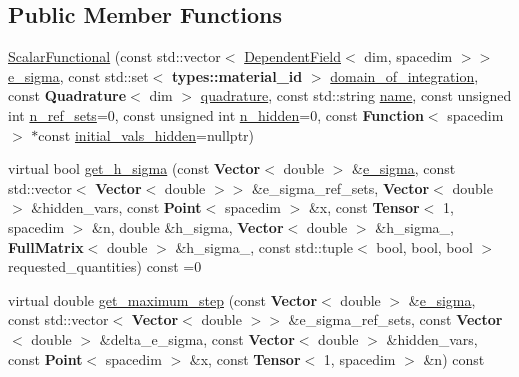 \subsection*{Public Member Functions}
\begin{DoxyCompactItemize}
\item 
\hyperlink{class_scalar_functional_ac0618ada3b80400784ee8553a66aade9}{Scalar\+Functional} (const std\+::vector$<$ \hyperlink{class_dependent_field}{Dependent\+Field}$<$ dim, spacedim $>$$>$ \hyperlink{class_scalar_functional_a86662b03a63219227993a2c6c07aefc1}{e\+\_\+sigma}, const std\+::set$<$ {\bf types\+::material\+\_\+id} $>$ \hyperlink{class_scalar_functional_ae3b6dd6934e1cd55fcc55cf344179407}{domain\+\_\+of\+\_\+integration}, const {\bf Quadrature}$<$ dim $>$ \hyperlink{class_scalar_functional_adea9ff214aeb2a1d8c3712a9d2433883}{quadrature}, const std\+::string \hyperlink{class_scalar_functional_a4d184688053b3443d10e228e4a8eba60}{name}, const unsigned int \hyperlink{class_scalar_functional_a7e12423f4b29e9e0aaa0f7f9c2d1c0eb}{n\+\_\+ref\+\_\+sets}=0, const unsigned int \hyperlink{class_scalar_functional_a8b1617930242870f22eef5e306cb717f}{n\+\_\+hidden}=0, const {\bf Function}$<$ spacedim $>$ $\ast$const \hyperlink{class_scalar_functional_a602d0bc2c945822c6b756fc63183ae2b}{initial\+\_\+vals\+\_\+hidden}=nullptr)
\item 
virtual bool \hyperlink{class_scalar_functional_a1b9874b2fd591c844ecfcd1db8212c54}{get\+\_\+h\+\_\+sigma} (const {\bf Vector}$<$ double $>$ \&\hyperlink{class_scalar_functional_a86662b03a63219227993a2c6c07aefc1}{e\+\_\+sigma}, const std\+::vector$<$ {\bf Vector}$<$ double $>$$>$ \&e\+\_\+sigma\+\_\+ref\+\_\+sets, {\bf Vector}$<$ double $>$ \&hidden\+\_\+vars, const {\bf Point}$<$ spacedim $>$ \&x, const {\bf Tensor}$<$ 1, spacedim $>$ \&n, double \&h\+\_\+sigma, {\bf Vector}$<$ double $>$ \&h\+\_\+sigma\+\_, {\bf Full\+Matrix}$<$ double $>$ \&h\+\_\+sigma\+\_, const std\+::tuple$<$ bool, bool, bool $>$ requested\+\_\+quantities) const =0
\item 
virtual double \hyperlink{class_scalar_functional_a31e4e48bb968b12fde76530c343b433d}{get\+\_\+maximum\+\_\+step} (const {\bf Vector}$<$ double $>$ \&\hyperlink{class_scalar_functional_a86662b03a63219227993a2c6c07aefc1}{e\+\_\+sigma}, const std\+::vector$<$ {\bf Vector}$<$ double $>$$>$ \&e\+\_\+sigma\+\_\+ref\+\_\+sets, const {\bf Vector}$<$ double $>$ \&delta\+\_\+e\+\_\+sigma, const {\bf Vector}$<$ double $>$ \&hidden\+\_\+vars, const {\bf Point}$<$ spacedim $>$ \&x, const {\bf Tensor}$<$ 1, spacedim $>$ \&n) const 
$$
\end{DoxyCompactItemize}
